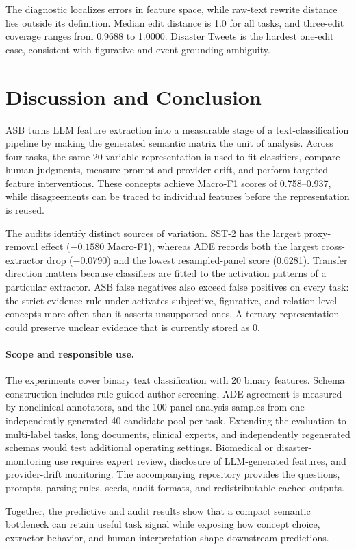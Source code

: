 \documentclass[runningheads]{llncs}
\begin{document}
The diagnostic localizes errors in feature space, while raw-text rewrite distance lies outside its definition. Median edit distance is 1.0 for all tasks, and three-edit coverage ranges from 0.9688 to 1.0000. Disaster Tweets is the hardest one-edit case, consistent with figurative and event-grounding ambiguity.
\FloatBarrier

\section{Discussion and Conclusion}

ASB turns LLM feature extraction into a measurable stage of a text-classification pipeline by making the generated semantic matrix the unit of analysis. Across four tasks, the same 20-variable representation is used to fit classifiers, compare human judgments, measure prompt and provider drift, and perform targeted feature interventions. These concepts achieve Macro-F1 scores of 0.758--0.937, while disagreements can be traced to individual features before the representation is reused.

The audits identify distinct sources of variation. SST-2 has the largest proxy-removal effect ($-0.1580$ Macro-F1), whereas ADE records both the largest cross-extractor drop ($-0.0790$) and the lowest resampled-panel score (0.6281). Transfer direction matters because classifiers are fitted to the activation patterns of a particular extractor. ASB false negatives also exceed false positives on every task: the strict evidence rule under-activates subjective, figurative, and relation-level concepts more often than it asserts unsupported ones. A ternary representation could preserve unclear evidence that is currently stored as 0.

\paragraph{Scope and responsible use.}
The experiments cover binary text classification with 20 binary features. Schema construction includes rule-guided author screening, ADE agreement is measured by nonclinical annotators, and the 100-panel analysis samples from one independently generated 40-candidate pool per task. Extending the evaluation to multi-label tasks, long documents, clinical experts, and independently regenerated schemas would test additional operating settings. Biomedical or disaster-monitoring use requires expert review, disclosure of LLM-generated features, and provider-drift monitoring. The accompanying repository provides the questions, prompts, parsing rules, seeds, audit formats, and redistributable cached outputs.

Together, the predictive and audit results show that a compact semantic bottleneck can retain useful task signal while exposing how concept choice, extractor behavior, and human interpretation shape downstream predictions.

\appendix




\end{document}
